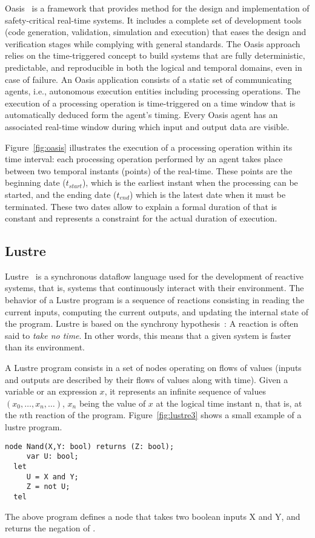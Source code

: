 Oasis~\cite{intro:oasis1,intro:oasis2} is a framework that provides method for the design 
and implementation of safety-critical real-time systems. It includes a complete set of 
development tools (code generation, validation, simulation and execution) that eases the design 
and verification stages
while complying with general standards. The Oasis approach relies on the time-triggered concept
to build systems that are fully deterministic, predictable, and reproducible in both the logical
and temporal domains, even in case of failure.
An Oasis application consists of a static set of communicating agents, i.e., autonomous execution
entities including processing operations. The execution of a processing operation is 
time-triggered on a time window that is automatically deduced form the agent's timing.
Every Oasis agent has an associated real-time window during which input and output data are 
visible.

Figure~\ref{fig:oasis} illustrates the execution of a processing operation within its time
interval: each processing operation performed by an
agent takes place between two temporal instants (points) of the real-time. 
These points are the beginning date ($t_{start}$), which is the earliest instant
when the processing can be started, and the ending date ($t_{end}$) which is the latest
date when it must be terminated. These two dates allow to explain a formal duration of
that is constant and represents a constraint for the actual duration of execution.

\subsection{Lustre}
Lustre~\cite{intro:lustre} is a synchronous dataflow language used for the development of 
reactive systems, that is, systems that continuously interact with their environment.
The behavior of a Lustre program is a sequence of reactions consisting in reading the current 
inputs, computing the current outputs, and updating the internal state of the program. 
Lustre is based on the synchrony hypothesis~\cite{intro:lustre2}: A reaction is often said to 
\emph{take no time}. In other words, this means that a given system is faster than its 
environment. 

A Lustre program consists in a set of nodes operating on flows of values (inputs and outputs 
are described by their flows of values along with time). Given a variable or an expression $x$,
it represents an infinite sequence of values $(x_0,\ldots,x_n,\ldots)$, $x_n$ being the value
of $x$ at the logical time instant n, that is, at the $n$th  reaction of the program. 
Figure~\ref{fig:lustre3} shows a small example of a lustre program.
\begin{lstlisting}[caption={A Lustre Programm},label={fig:lustre3},captionpos=b]
  node Nand(X,Y: bool) returns (Z: bool);
     var U: bool;
  let
     U = X and Y;
     Z = not U;
  tel
\end{lstlisting}
The above program defines a node that takes two boolean inputs X and Y, and returns the negation
of .
